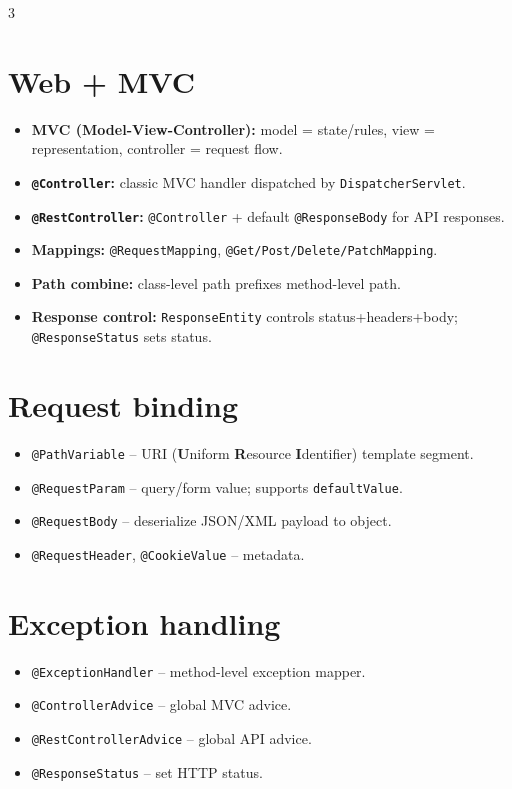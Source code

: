 \begin{multicols}{3}
\columnbreak

\section*{Web + MVC}
\begin{itemize}[leftmargin=*, nosep, topsep=0pt]
  \item \textbf{MVC (\textbf{M}odel-\textbf{V}iew-\textbf{C}ontroller):} model = state/rules, view = representation, controller = request flow.
  \item \textbf{\texttt{@Controller}:} classic MVC handler dispatched by \texttt{DispatcherServlet}.
  \item \textbf{\texttt{@RestController}:} \texttt{@Controller} + default \texttt{@ResponseBody} for API responses.
  \item \textbf{Mappings:} \texttt{@RequestMapping}, \texttt{@Get/Post/Delete/PatchMapping}.
  \item \textbf{Path combine:} class-level path prefixes method-level path.
  \item \textbf{Response control:} \texttt{ResponseEntity} controls status+headers+body; \texttt{@ResponseStatus} sets status.
\end{itemize}

\section*{Request binding}
\begin{itemize}[leftmargin=*, nosep, topsep=0pt]
  \item \texttt{@PathVariable} -- URI (\textbf{U}niform \textbf{R}esource \textbf{I}dentifier) template segment.
  \item \texttt{@RequestParam} -- query/form value; supports \texttt{defaultValue}.
  \item \texttt{@RequestBody} -- deserialize JSON/XML payload to object.
  \item \texttt{@RequestHeader}, \texttt{@CookieValue} -- metadata.
\end{itemize}

\section*{Exception handling}
\begin{itemize}[leftmargin=*, nosep, topsep=0pt]
  \item \texttt{@ExceptionHandler} -- method-level exception mapper.
  \item \texttt{@ControllerAdvice} -- global MVC advice.
  \item \texttt{@RestControllerAdvice} -- global API advice.
  \item \texttt{@ResponseStatus} -- set HTTP status.
\end{itemize}


\end{multicols}
